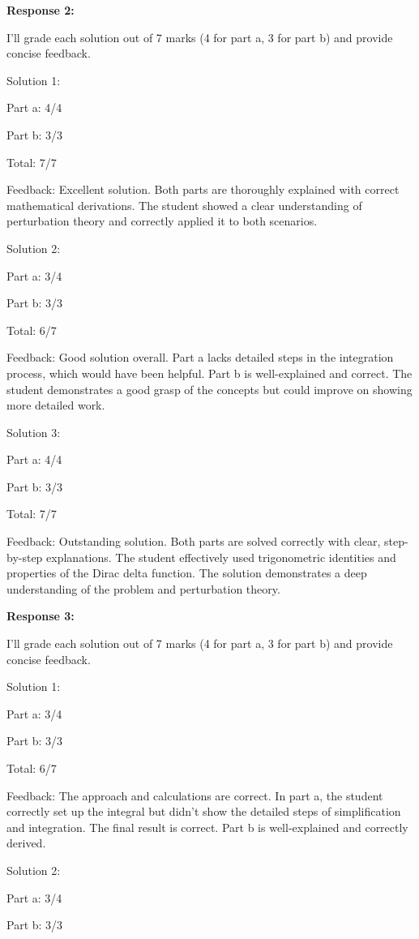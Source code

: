 \documentclass[a4paper,11pt]{article}
\begin{document}
\bigskip
\textbf{Response 2:}

I'll grade each solution out of 7 marks (4 for part a, 3 for part b) and provide concise feedback.

Solution 1:

Part a: 4/4

Part b: 3/3

Total: 7/7

Feedback: Excellent solution. Both parts are thoroughly explained with correct mathematical derivations. The student showed a clear understanding of perturbation theory and correctly applied it to both scenarios.

Solution 2:

Part a: 3/4

Part b: 3/3

Total: 6/7

Feedback: Good solution overall. Part a lacks detailed steps in the integration process, which would have been helpful. Part b is well-explained and correct. The student demonstrates a good grasp of the concepts but could improve on showing more detailed work.

Solution 3:

Part a: 4/4

Part b: 3/3

Total: 7/7

Feedback: Outstanding solution. Both parts are solved correctly with clear, step-by-step explanations. The student effectively used trigonometric identities and properties of the Dirac delta function. The solution demonstrates a deep understanding of the problem and perturbation theory.

\bigskip
\textbf{Response 3:}

I'll grade each solution out of 7 marks (4 for part a, 3 for part b) and provide concise feedback.

Solution 1:

Part a: 3/4

Part b: 3/3

Total: 6/7

Feedback: The approach and calculations are correct. In part a, the student correctly set up the integral but didn't show the detailed steps of simplification and integration. The final result is correct. Part b is well-explained and correctly derived.

Solution 2:

Part a: 3/4

Part b: 3/3
\end{document}
